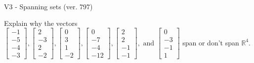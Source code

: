 \begin{exercise}
  \begin{exerciseTitle}V3 - Spanning sets (ver. 797)\end{exerciseTitle}
  \begin{exerciseStatement}
    Explain why the vectors \(\left[\begin{array}{r}
-1 \\
-5 \\
-4 \\
-3
\end{array}\right] , \left[\begin{array}{r}
2 \\
-3 \\
2 \\
-2
\end{array}\right] , \left[\begin{array}{r}
0 \\
3 \\
1 \\
-2
\end{array}\right] , \left[\begin{array}{r}
0 \\
-7 \\
-4 \\
-12
\end{array}\right] , \left[\begin{array}{r}
2 \\
2 \\
-1 \\
-1
\end{array}\right] , \text{ and } \left[\begin{array}{r}
0 \\
-3 \\
-1 \\
1
\end{array}\right]\) span or don't span \(\mathbb{R}^4\). 
	



\end{exerciseStatement}
\end{exercise}
